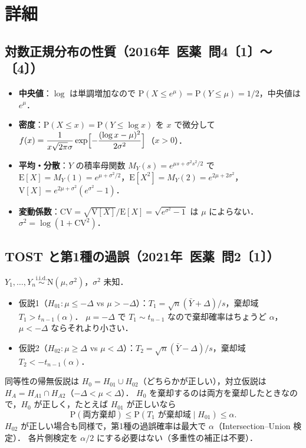 \documentclass[a4paper,11pt,openany]{ltjsbook}
\newcommand{\kakomon}[2]{\mbox{#1年 医薬 問#2}}
\newcommand{\E}{\mathrm{E}}
\newcommand{\V}{\mathrm{V}}
\newcommand{\Prob}{\mathrm{P}}
\newcommand{\iid}{\overset{\text{i.i.d.}}{\sim}}
\newcommand{\Normal}{\mathrm{N}}
\begin{document}
\section{詳細}\label{sec:m10-shosai}
\subsection{対数正規分布の性質（\kakomon{2016}{4}〔1〕〜〔4〕）}
\begin{itemize}
\item \textbf{中央値}：$\log$ は単調増加なので $\Prob(X\le e^\mu)=\Prob(Y\le\mu)=1/2$，中央値は $e^\mu$．
\item \textbf{密度}：$\Prob(X\le x)=\Prob(Y\le\log x)$ を $x$ で微分して $f(x)=\dfrac{1}{x\sqrt{2\pi}\sigma}\exp\Bigl[-\dfrac{(\log x-\mu)^2}{2\sigma^2}\Bigr]$（$x>0$）．
\item \textbf{平均・分散}：$Y$ の積率母関数 $M_Y(s)=e^{\mu s+\sigma^2s^2/2}$ で $\E[X]=M_Y(1)=e^{\mu+\sigma^2/2}$，$\E[X^2]=M_Y(2)=e^{2\mu+2\sigma^2}$，
      $\V[X]=e^{2\mu+\sigma^2}(e^{\sigma^2}-1)$．
\item \textbf{変動係数}：$\mathrm{CV}=\sqrt{\V[X]}/\E[X]=\sqrt{e^{\sigma^2}-1}$ は $\mu$ によらない．$\sigma^2=\log(1+\mathrm{CV}^2)$．
\end{itemize}

\subsection{TOST と第1種の過誤（\kakomon{2021}{2}〔1〕）}
$Y_1,\dots,Y_n\iid\Normal(\mu,\sigma^2)$，$\sigma^2$ 未知．
\begin{itemize}
\item 仮説1（$H_{01}:\mu\le-\Delta$ vs $\mu>-\Delta$）：$T_1=\sqrt n(\bar Y+\Delta)/s$，棄却域 $T_1>t_{n-1}(\alpha)$．
      $\mu=-\Delta$ で $T_1\sim t_{n-1}$ なので棄却確率はちょうど $\alpha$，$\mu<-\Delta$ ならそれより小さい．
\item 仮説2（$H_{02}:\mu\ge\Delta$ vs $\mu<\Delta$）：$T_2=\sqrt n(\bar Y-\Delta)/s$，棄却域 $T_2<-t_{n-1}(\alpha)$．
\end{itemize}
同等性の帰無仮説は $H_0=H_{01}\cup H_{02}$（どちらかが正しい），対立仮説は $H_A=H_{A1}\cap H_{A2}$（$-\Delta<\mu<\Delta$）．
$H_0$ を棄却するのは両方を棄却したときなので，$H_0$ が正しく，たとえば $H_{01}$ が正しいなら
\[
\Prob(\text{両方棄却})\le\Prob(T_1\text{ が棄却域}\mid H_{01})\le\alpha .
\]
$H_{02}$ が正しい場合も同様で，第1種の過誤確率は最大で $\alpha$（Intersection--Union 検定）．
各片側検定を $\alpha/2$ にする必要はない（多重性の補正は不要）．
\end{document}
